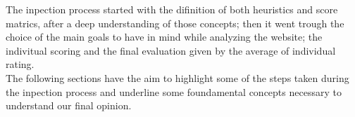 The inpection process started with the difinition of both heuristics and score matrics, after a deep understanding of those concepts; then it went trough the choice of the main goals to have in mind while analyzing the website; the indivitual scoring and the final evaluation given by the average of individual rating.\\
The following sections have the aim to highlight some of the steps taken during the inpection process and underline some foundamental concepts necessary to understand our final opinion.